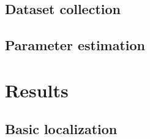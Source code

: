 \documentclass[letterpaper, 10pt, conference]{ieeeconf}
\begin{document}
\subsection{Dataset collection}

\subsection{Parameter estimation}
\label{sec:mle}

\section{Results}

\subsection{Basic localization}
\end{document}
